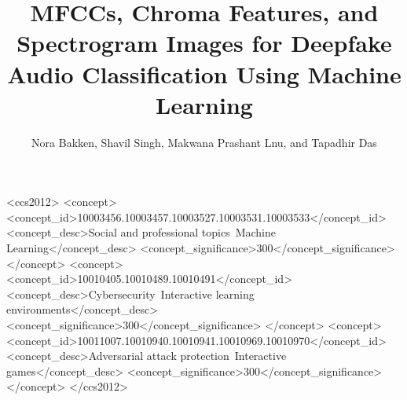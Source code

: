 \documentclass[sigconf,authordraft]{acmart}
\begin{document}
\title{MFCCs, Chroma Features, and Spectrogram Images for Deepfake Audio Classification Using Machine Learning}

\author{Nora Bakken, Shavil Singh, Makwana Prashant Lnu, and Tapadhir Das}



\renewcommand{\shortauthors}{Bakken, Singh, \& Lnu, et al.}

\begin{abstract}

\end{abstract}

\begin{CCSXML}
<ccs2012>
 <concept>
<concept_id>10003456.10003457.10003527.10003531.10003533</concept_id>
<concept_desc>Social and professional topics~Machine Learning</concept_desc>
<concept_significance>300</concept_significance>
</concept>
<concept>
<concept_id>10010405.10010489.10010491</concept_id>
<concept_desc>Cybersecurity~Interactive learning environments</concept_desc>
<concept_significance>300</concept_significance>
</concept>
<concept>
<concept_id>10011007.10010940.10010941.10010969.10010970</concept_id>
<concept_desc>Adversarial attack protection~Interactive games</concept_desc>
<concept_significance>300</concept_significance>
</concept>
</ccs2012>
\end{CCSXML}
\end{document}
